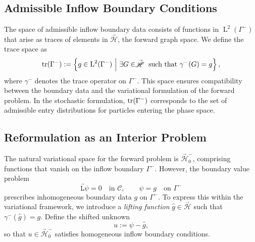 \documentclass{amsart}
\newcommand{\dd}{{\mathrm d}}
\newcommand{\bT}{\stackrel{_\leftarrow}{\mathtt T}}
\newcommand{\fL}{\stackrel{_\rightarrow}{\mathtt L}}
\newcommand{\bL}{\stackrel{_\leftarrow}{\mathtt L}}
\theoremstyle{plain}
\renewcommand{\vec}[1]{\ensuremath{\boldsymbol{#1}}}
\newcommand{\leb}{\text{Leb}}
\newcommand{\LL}{\ensuremath{\operatorname L}\xspace}
\renewcommand{\leb}[1]{\ensuremath{\LL^{#1}}}
\newcommand{\cH}{\stackrel{_\rightarrow}{\mathscr H}}
\newcommand{\cS}{\ensuremath{\mathscr S}}
\begin{document}
%

\subsection{Admissible Inflow Boundary Conditions}

The space of admissible inflow boundary data consists of functions in
$\leb2(\Gamma^-)$ that arise as traces of elements in $\cH$, the
forward graph space. We define the trace space as
\begin{equation}
    {\rm{tr}}(\Gamma^-) := \left\{
    g \in \leb2(\Gamma^-)
    ~\middle|~
    \exists G \in \cH \text{ such that } \gamma^- (G) = g
    \right\},
\end{equation}
where $\gamma^-$ denotes the trace operator on $\Gamma^-$. This space
ensures compatibility between the boundary data and the variational
formulation of the forward problem. In the stochastic formulation,
${\rm tr}(\Gamma^-)$ corresponds to the set of admissible entry
distributions for particles entering the phase space.

\subsection{Reformulation as an Interior Problem}

The natural variational space for the forward problem is $\cH_0^-$,
comprising functions that vanish on the inflow boundary
$\Gamma^-$. However, the boundary value problem
\begin{equation}
  \label{eq:BFPE}
  \fL \psi = 0 \quad \text{in } \mathcal{C}, \qquad \psi = g \quad \text{on } \Gamma^-
\end{equation}
prescribes inhomogeneous boundary data $g$ on $\Gamma^-$. To express
this within the variational framework, we introduce a \emph{lifting
function} $\widehat g \in \cH$ such that $\gamma^- (\widehat g) = g$. Define the
shifted unknown
\begin{equation}\label{eq:extension_of_g}
  u := \psi - \widehat g,
\end{equation}
so that $u \in \cH_0^-$ satisfies homogeneous inflow boundary
conditions.
\end{document}

